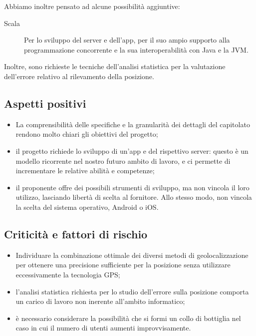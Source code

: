 \documentclass[../studio-di-fattibilita.tex]{subfiles}
\begin{document}
  Abbiamo inoltre pensato ad alcune possibilità aggiuntive:
  \begin{description}
    \item[Scala] Per lo sviluppo del server e dell'app, per il suo ampio supporto alla programmazione concorrente e la sua interoperabilità con Java e la JVM.
  \end{description}
  Inoltre, sono richieste le tecniche dell'analisi statistica per la valutazione dell'errore relativo al rilevamento della posizione.


  \subsection{Aspetti positivi}%
  \label{subsec:aspetti_positivi}
  \begin{itemize}
    \item La comprensibilità delle specifiche e la granularità dei dettagli del capitolato rendono molto chiari gli obiettivi del progetto;
    \item il progetto richiede lo sviluppo di un'app e del rispettivo server: questo è un modello ricorrente nel nostro futuro ambito di lavoro, e ci permette di incrementare le relative abilità e competenze;
    \item il proponente offre dei possibili strumenti di sviluppo, ma non vincola il loro utilizzo, lasciando libertà di scelta al fornitore. Allo stesso modo, non vincola la scelta del sistema operativo, Android o iOS.
  \end{itemize}


  \subsection{Criticità e fattori di rischio}%
  \label{subsec:criticita_e_fattori_di_rischio}
  \begin{itemize}
    \item Individuare la combinazione ottimale dei diversi metodi di geolocalizzazione per ottenere una precisione sufficiente per la posizione senza utilizzare eccessivamente la tecnologia GPS;
    \item l'analisi statistica richiesta per lo studio dell'errore sulla posizione comporta un carico di lavoro non inerente all'ambito informatico;
    \item è necessario considerare la possibilità che si formi un collo di bottiglia nel caso in cui il numero di utenti aumenti improvvisamente.
  \end{itemize}
\end{document}
